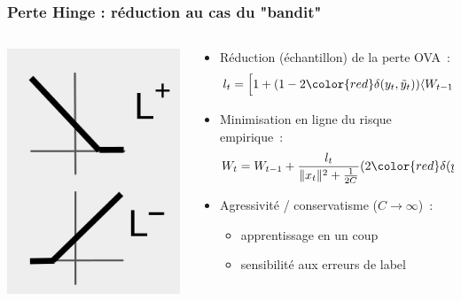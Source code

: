 \documentclass{beamer}
\begin{document}
\begin{frame}\frametitle{Perte Hinge : réduction au cas du "bandit"}
	\begin{columns}
		\begin{column}{.2 \linewidth}
			\centerline{\includegraphics[width=\linewidth]{figs/cap-loss.png}}
		\end{column}
		\begin{column}{.8 \linewidth}
			\begin{itemize}
				\item Réduction (échantillon) de la perte OVA~: 
				$$l_t =  \left[1 + (1 - 2 {\color{red}\delta(y_t,\tilde{y}_t)}) \langle W_{t-1}, X_t^{\tilde{y}_t}\rangle\right]_+$$

				\item Minimisation en ligne du risque empirique~:
				$$W_{t} =  W_{t-1} + \frac{l_t}{\|x_t\|^2 + \frac{1}{2C}}  (2 {\color{red}\delta(y_t,\tilde{y}_t)} - 1) X_t^{\tilde{y}_t}$$		
				\item Agressivité / conservatisme ($C \rightarrow \infty$)~:
				\begin{itemize}
					\item apprentissage en un coup
					\item sensibilité aux erreurs de label
				\end{itemize}	
			\end{itemize}
		\end{column}
	\end{columns}
\end{frame}
\end{document}
